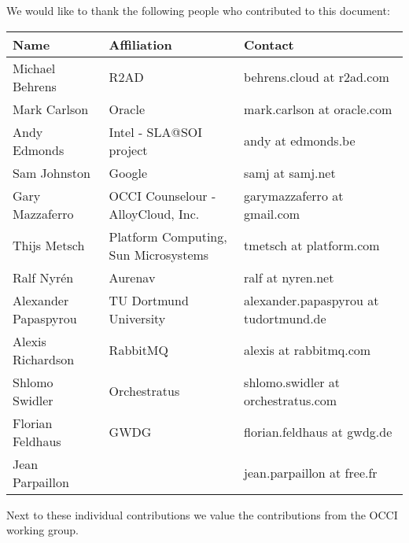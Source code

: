 
We would like to thank the following people who contributed to this
document:

\begin{tabular}{l|p{2in}|p{2in}}
Name & Affiliation & Contact \\
\hline
Michael Behrens & R2AD & behrens.cloud at r2ad.com \\
Mark Carlson & Oracle & mark.carlson at oracle.com \\
Andy Edmonds & Intel - SLA@SOI project & andy at edmonds.be \\
Sam Johnston & Google & samj at samj.net \\
Gary Mazzaferro & OCCI Counselour - AlloyCloud, Inc. &  garymazzaferro at gmail.com \\ 
Thijs Metsch & Platform Computing, Sun Microsystems & tmetsch at platform.com \\
Ralf Nyrén & Aurenav & ralf at nyren.net \\
Alexander Papaspyrou & TU Dortmund University & alexander.papaspyrou at tu\-dortmund.de \\
Alexis Richardson & RabbitMQ & alexis at rabbitmq.com \\
Shlomo Swidler & Orchestratus & shlomo.swidler at orchestratus.com \\
Florian Feldhaus & GWDG & florian.feldhaus at gwdg.de \\
Jean Parpaillon & & jean.parpaillon at free.fr \\
\end{tabular}

Next to these individual contributions we value the contributions from
the OCCI working group.
